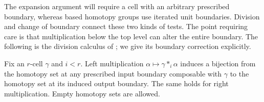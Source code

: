 The expansion argument will require a cell with an arbitrary prescribed
boundary, whereas based homotopy groups use iterated unit boundaries.
Division and change of boundary connect these two kinds of tests.
The point requiring care is that multiplication below the top level
can alter the entire boundary.  The following is the division
calculus of \cite[Lemma~4.12]{Ara2013}; we give its boundary correction
explicitly.

\begin{lemma}\label{lem:prelim-division}
Fix an $r$-cell $\gamma$ and $i<r$.  Left multiplication
$\alpha\mapsto\gamma*_i\alpha$ induces a bijection from the
homotopy set at any prescribed input boundary composable with $\gamma$
to the homotopy set
at its induced output boundary.  The same holds for right
multiplication.  Empty homotopy sets are allowed.
\end{lemma}

